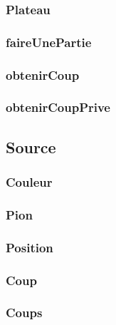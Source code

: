 \documentclass{article}
\begin{document}
\subsubsection{Plateau}


\subsubsection{faireUnePartie}


\subsubsection{obtenirCoup}


\subsubsection{obtenirCoupPrive}


\subsection{Source}

\subsubsection{Couleur}


\subsubsection{Pion}


\subsubsection{Position}


\subsubsection{Coup}


\subsubsection{Coups}

\end{document}
